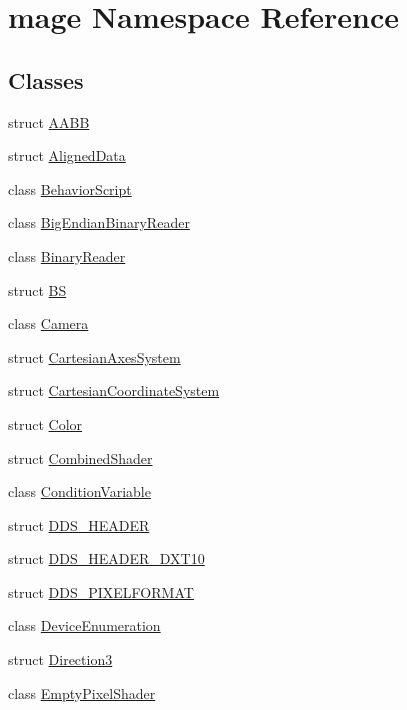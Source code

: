 \hypertarget{namespacemage}{}\section{mage Namespace Reference}
\label{namespacemage}
\subsection*{Classes}
\begin{DoxyCompactItemize}
\item 
struct \hyperlink{structmage_1_1_a_a_b_b}{A\+A\+BB}
\item 
struct \hyperlink{structmage_1_1_aligned_data}{Aligned\+Data}
\item 
class \hyperlink{classmage_1_1_behavior_script}{Behavior\+Script}
\item 
class \hyperlink{classmage_1_1_big_endian_binary_reader}{Big\+Endian\+Binary\+Reader}
\item 
class \hyperlink{classmage_1_1_binary_reader}{Binary\+Reader}
\item 
struct \hyperlink{structmage_1_1_b_s}{BS}
\item 
class \hyperlink{classmage_1_1_camera}{Camera}
\item 
struct \hyperlink{structmage_1_1_cartesian_axes_system}{Cartesian\+Axes\+System}
\item 
struct \hyperlink{structmage_1_1_cartesian_coordinate_system}{Cartesian\+Coordinate\+System}
\item 
struct \hyperlink{structmage_1_1_color}{Color}
\item 
struct \hyperlink{structmage_1_1_combined_shader}{Combined\+Shader}
\item 
class \hyperlink{classmage_1_1_condition_variable}{Condition\+Variable}
\item 
struct \hyperlink{structmage_1_1_d_d_s___h_e_a_d_e_r}{D\+D\+S\+\_\+\+H\+E\+A\+D\+ER}
\item 
struct \hyperlink{structmage_1_1_d_d_s___h_e_a_d_e_r___d_x_t10}{D\+D\+S\+\_\+\+H\+E\+A\+D\+E\+R\+\_\+\+D\+X\+T10}
\item 
struct \hyperlink{structmage_1_1_d_d_s___p_i_x_e_l_f_o_r_m_a_t}{D\+D\+S\+\_\+\+P\+I\+X\+E\+L\+F\+O\+R\+M\+AT}
\item 
class \hyperlink{classmage_1_1_device_enumeration}{Device\+Enumeration}
\item 
struct \hyperlink{structmage_1_1_direction3}{Direction3}
\item 
class \hyperlink{classmage_1_1_empty_pixel_shader}{Empty\+Pixel\+Shader}

\end{DoxyCompactItemize}
